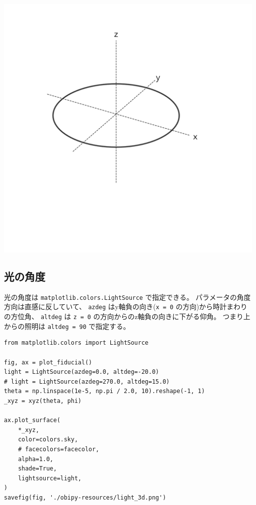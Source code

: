 \documentclass[a4paper, 10pt, notitlepage, twocolumn, uplatex, oneside, dvipdfmx]{jsarticle}
\begin{document}
\label{}
\begin{center}
\includegraphics[width=1.0\linewidth]{./obipy-resources/lines_3d.png}
\end{center}
\subsection{光の角度}
\label{sec:org1d155c3}
光の角度は \texttt{matplotlib.colors.LightSource} で指定できる。
パラメータの角度方向は直感に反していて、
\texttt{azdeg} はy軸負の向き(\texttt{x = 0} の方向)から時計まわりの方位角、
\texttt{altdeg} は \texttt{z = 0} の方向からのz軸負の向きに下がる仰角。
つまり上からの照明は \texttt{altdeg = 90} で指定する。
\begin{verbatim}
from matplotlib.colors import LightSource

fig, ax = plot_fiducial()
light = LightSource(azdeg=0.0, altdeg=-20.0)
# light = LightSource(azdeg=270.0, altdeg=15.0)
theta = np.linspace(1e-5, np.pi / 2.0, 10).reshape(-1, 1)
_xyz = xyz(theta, phi)

ax.plot_surface(
    *_xyz,
    color=colors.sky,
    # facecolors=facecolor,
    alpha=1.0,
    shade=True,
    lightsource=light,
)
savefig(fig, './obipy-resources/light_3d.png')
\end{verbatim}
\end{document}
